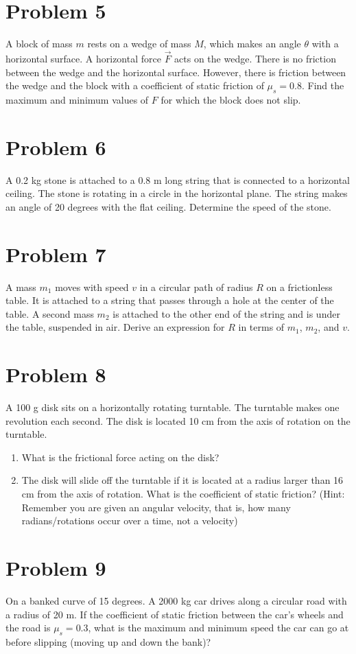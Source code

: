 \documentclass[tikz,border=10pt]{article}
\begin{document}
\section*{Problem 5}
A block of mass $m$ rests on a wedge of mass $M$, which makes an angle $\theta$ with a horizontal surface. A horizontal force $\Vec{F}$ acts on the wedge. There is no friction between the wedge and the horizontal surface. However, there is friction between the wedge and the block with a coefficient of static friction of $\mu_s = 0.8$. Find the maximum and minimum values of $F$ for which the block does not slip.

\section*{Problem 6}
A 0.2 kg stone is attached to a 0.8 m long string that is connected to a horizontal ceiling. The stone is rotating in a circle in the horizontal plane. The string makes an angle of 20 degrees with the flat ceiling. Determine the speed of the stone.

\section*{Problem 7}
A mass $m_1$ moves with speed $v$ in a circular path of radius $R$ on a frictionless table. It is attached to a string that passes through a hole at the center of the table. A second mass $m_2$ is attached to the other end of the string and is under the table, suspended in air. Derive an expression for $R$ in terms of $m_1$, $m_2$, and $v$.

\section*{Problem 8}
A 100 g disk sits on a horizontally rotating turntable. The turntable makes one revolution each second. The disk is located 10 cm from the axis of rotation on the turntable.
\begin{enumerate}
    \item What is the frictional force acting on the disk?
    \item The disk will slide off the turntable if it is located at a radius larger than 16 cm from the axis of rotation. What is the coefficient of static friction? (Hint: Remember you are given an angular velocity, that is, how many radians/rotations occur over a time, not a velocity)
\end{enumerate}

\section*{Problem 9}
On a banked curve of 15 degrees. A 2000 kg car drives along a circular road with a radius of 20 m. If the coefficient of static friction between the car's wheels and the road is $\mu_s = 0.3$, what is the maximum and minimum speed the car can go at before slipping (moving up and down the bank)?
\end{document}
